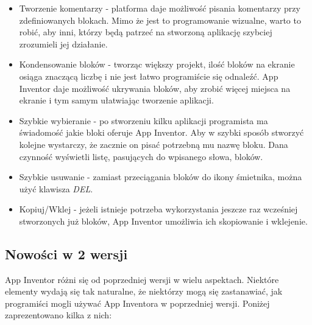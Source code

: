\begin{itemize}
\item Tworzenie komentarzy - platforma daje możliwość pisania komentarzy przy zdefiniowanych blokach. Mimo że jest to programowanie wizualne, warto to robić, aby inni, którzy będą patrzeć na stworzoną aplikację szybciej zrozumieli jej działanie.
\item Kondensowanie bloków - tworząc większy projekt, ilość bloków na ekranie osiąga znaczącą liczbę i nie jest łatwo programiście się odnaleźć. App Inventor daje możliwość ukrywania bloków, aby zrobić więcej miejsca na ekranie i tym samym ułatwiając tworzenie aplikacji.
\item Szybkie wybieranie - po stworzeniu kilku aplikacji programista ma świadomość jakie bloki oferuje App Inventor. Aby w szybki sposób stworzyć kolejne wystarczy, że zacznie on pisać potrzebną mu nazwę bloku. Dana czynność wyświetli listę, pasujących do wpisanego słowa, bloków.
\item Szybkie usuwanie - zamiast przeciągania bloków do ikony śmietnika, można użyć klawisza \emph{DEL}.
\item Kopiuj/Wklej - jeżeli istnieje potrzeba wykorzystania jeszcze raz wcześniej stworzonych już bloków, App Inventor umożliwia ich skopiowanie i wklejenie.
\end{itemize}

\subsection{Nowości w 2 wersji}

App Inventor różni się od poprzedniej wersji w wielu aspektach.\cite{android:43} Niektóre elementy wydają się tak naturalne, że niektórzy mogą się zastanawiać, jak programiści mogli używać App Inventora w poprzedniej wersji. Poniżej zaprezentowano kilka z nich:

